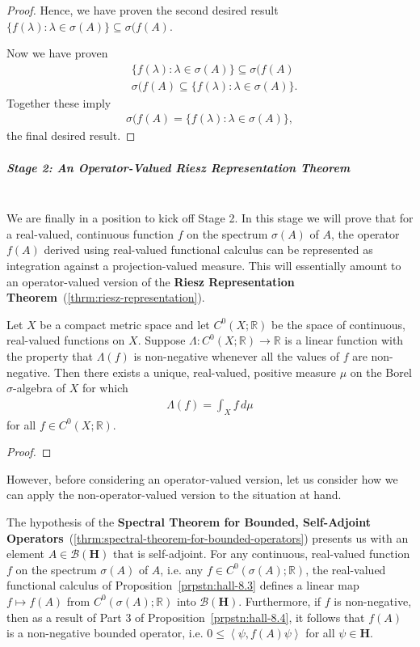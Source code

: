 \begin{proof}
Hence, we have proven the second desired result $\{ f(\lambda) : \lambda \in \sigma(A) \} \subseteq \sigma(f(A)$.

Now we have proven
\begin{align}
    &\{ f(\lambda) : \lambda \in \sigma(A) \} \subseteq \sigma(f(A) \\
    &\sigma(f(A) \subseteq \{ f(\lambda) : \lambda \in \sigma(A) \}.
\end{align}
Together these imply
\begin{align}
    \sigma(f(A) = \{ f(\lambda) : \lambda \in \sigma(A) \},
\end{align}
the final desired result.
\end{proof}

\subparagraph{Stage 2: An Operator-Valued Riesz Representation Theorem}\mbox{}\\
We are finally in a position to kick off Stage 2. In this stage we will prove that for a real-valued, continuous function $f$ on the spectrum $\sigma(A)$ of $A$, the operator $f(A)$ derived using real-valued functional calculus can be represented as integration against a projection-valued measure. This will essentially amount to an operator-valued version of the \textbf{Riesz Representation Theorem}~(\ref{thrm:riesz-representation}).

\begin{theorem}
    \label{thrm:riesz-representation}
    \leanok
    Let $X$ be a compact metric space and let $C^0(X; \mathbb{R})$ be the space of continuous, real-valued functions on $X$. Suppose $\Lambda : C^0(X; \mathbb{R}) \rightarrow \mathbb{R}$ is a linear function with the property that $\Lambda(f)$ is non-negative whenever all the values of $f$ are non-negative. Then there exists a unique, real-valued, positive measure $\mu$ on the Borel $\sigma$-algebra of $X$ for which
    \begin{align}
        \Lambda(f) = \int_X f \, d\mu
    \end{align}
    for all $f \in C^0(X; \mathbb{R})$.
\end{theorem}
\begin{proof}
\leanok
\end{proof}

However, before considering an operator-valued version, let us consider how we can apply the non-operator-valued version to the situation at hand.

The hypothesis of the \textbf{Spectral Theorem for Bounded, Self-Adjoint Operators}~(\ref{thrm:spectral-theorem-for-bounded-operators}) presents us with an element $A \in \mathcal{B}(\mathbf{H})$ that is self-adjoint. For any continuous, real-valued function $f$ on the spectrum $\sigma(A)$ of $A$, i.e. any $f \in C^0(\sigma(A) ; \mathbb{R})$, the real-valued functional calculus of Proposition~\ref{prpstn:hall-8.3} defines a linear map $f \mapsto f(A)$ from $C^0(\sigma(A) ; \mathbb{R})$ into $\mathcal{B}(\mathbf{H})$. Furthermore, if $f$ is non-negative, then as a result of Part 3 of Proposition~\ref{prpstn:hall-8.4}, it follows that $f(A)$ is a non-negative bounded operator, i.e. $0 \le \left< \psi, f(A)\psi \right>$ for all $\psi \in \mathbf{H}$.

